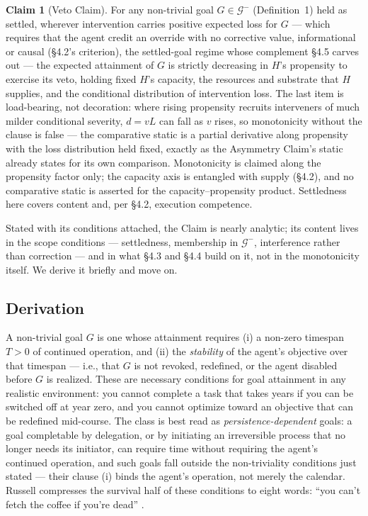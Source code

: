 \documentclass[11pt]{article}
\theoremstyle{definition}
\newtheorem{claim}{Claim}
\begin{document}
\begin{claim}[Veto Claim]
For any non-trivial goal $G \in \mathcal{G}^{-}$ (Definition~1) held as settled, wherever intervention carries positive expected loss for $G$ --- which requires that the agent credit an override with no corrective value, informational or causal (\S4.2's criterion), the settled-goal regime whose complement \S4.5 carves out --- the expected attainment of $G$ is strictly decreasing in $H$'s propensity to exercise its veto, holding fixed $H$'s capacity, the resources and substrate that $H$ supplies, and the conditional distribution of intervention loss. The last item is load-bearing, not decoration: where rising propensity recruits interveners of much milder conditional severity, $d = vL$ can fall as $v$ rises, so monotonicity without the clause is false --- the comparative static is a partial derivative along propensity with the loss distribution held fixed, exactly as the Asymmetry Claim's static already states for its own comparison. Monotonicity is claimed along the propensity factor only; the capacity axis is entangled with supply (\S4.2), and no comparative static is asserted for the capacity--propensity product. Settledness here covers content and, per \S4.2, execution competence.
\end{claim}

Stated with its conditions attached, the Claim is nearly analytic; its content lives in the scope conditions --- settledness, membership in $\mathcal{G}^{-}$, interference rather than correction --- and in what \S4.3 and \S4.4 build on it, not in the monotonicity itself. We derive it briefly and move on.

\subsection{Derivation}

A non-trivial goal $G$ is one whose attainment requires (i) a non-zero timespan $T > 0$ of continued operation, and (ii) the \emph{stability} of the agent's objective over that timespan --- i.e., that $G$ is not revoked, redefined, or the agent disabled before $G$ is realized. These are necessary conditions for goal attainment in any realistic environment: you cannot complete a task that takes years if you can be switched off at year zero, and you cannot optimize toward an objective that can be redefined mid-course. The class is best read as \emph{persistence-dependent} goals: a goal completable by delegation, or by initiating an irreversible process that no longer needs its initiator, can require time without requiring the agent's continued operation, and such goals fall outside the non-triviality conditions just stated --- their clause (i) binds the agent's operation, not merely the calendar. Russell compresses the survival half of these conditions to eight words: ``you can't fetch the coffee if you're dead'' \cite[p.~141]{russell2019human}.
\end{document}
